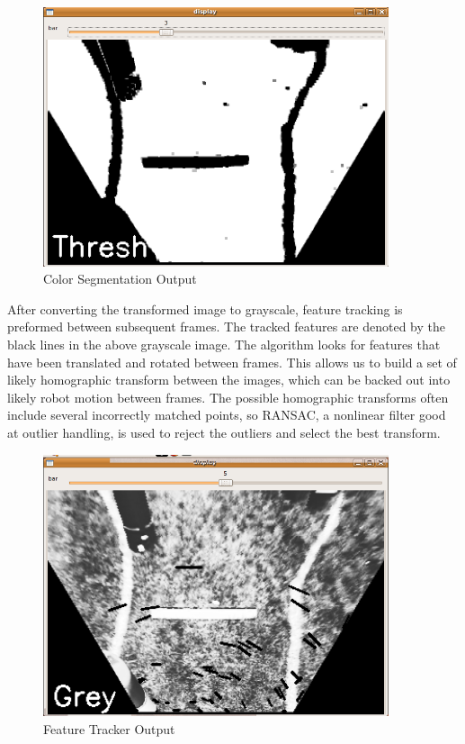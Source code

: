 \begin{figure}[H]
\begin{center}
\includegraphics[width=4in]{./pics/thresh.png}
\caption{Color Segmentation Output}
\label{FIG:ColorSeg}
\end{center}
\end{figure}

After converting the transformed image to grayscale, feature tracking is preformed between subsequent frames. The tracked features are denoted by the black lines in the above grayscale image. The algorithm looks for features that have been translated and rotated between frames. This allows us to build a set of likely homographic transform between the images, which can be backed out into likely robot motion between frames. The possible homographic transforms often include several incorrectly matched points, so RANSAC, a nonlinear filter good at outlier handling, is used to reject the outliers and select the best transform.

\begin{figure}[H]
\begin{center}
\includegraphics[width=4in]{./pics/feature.png}
\caption{Feature Tracker Output}
\label{FIG:Feature}
\end{center}
\end{figure}

